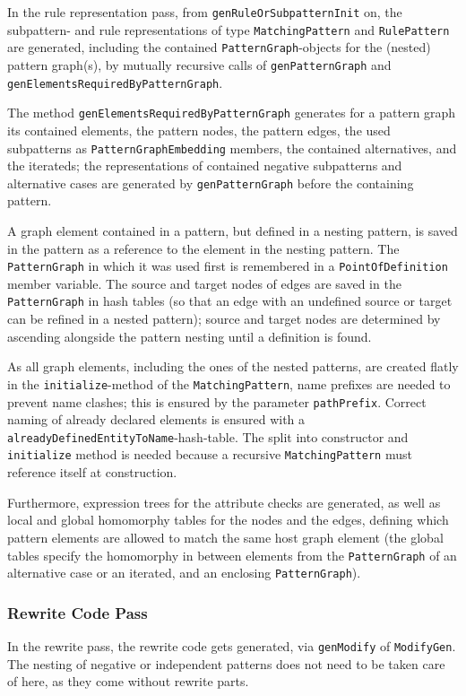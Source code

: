 In the rule representation pass, from \texttt{gen\-Rule\-Or\-Subpattern\-Init} on, the subpattern- and rule representations of type \texttt{Matching\-Pattern} and \texttt{Rule\-Pattern} are generated, including the contained \texttt{Pattern\-Graph}-objects for the (nested) pattern graph(s), by mutually recursive calls of \texttt{gen\-Pattern\-Graph} and \texttt{gen\-Elements\-Required\-By\-Pattern\-Graph}.

The method \texttt{gen\-Elements\-Required\-By\-Pattern\-Graph} generates for a pattern graph its contained elements, the pattern nodes, the pattern edges, the used subpatterns as \texttt{Pattern\-Graph\-Embedding} members, the contained alternatives, and the iterateds; the representations of contained negative subpatterns and alternative cases are generated by \texttt{gen\-Pattern\-Graph} before the containing pattern. 

A graph element contained in a pattern, but defined in a nesting pattern, is saved in the pattern as a reference to the element in the nesting pattern. 
The \texttt{Pattern\-Graph} in which it was used first is remembered in a \texttt{Point\-Of\-Definition} member variable.
The source and target nodes of edges are saved in the \texttt{Pattern\-Graph} in hash tables (so that an edge with an undefined source or target can be refined in a nested pattern); source and target nodes are determined by ascending alongside the pattern nesting until a definition is found.

As all graph elements, including the ones of the nested patterns, are created flatly in the \texttt{initialize}-method of the \texttt{Matching\-Pattern}, name prefixes are needed to prevent name clashes; this is ensured by the parameter \texttt{path\-Prefix}.
Correct naming of already declared elements is ensured with a \texttt{already\-Defined\-Entity\-To\-Name}-hash-table.
The split into constructor and \texttt{initialize} method is needed because a recursive \texttt{Matching\-Pattern} must reference itself at construction.

Furthermore, expression trees for the attribute checks are generated, as well as local and global homomorphy tables for the nodes and the edges, defining which pattern elements are allowed to match the same host graph element (the global tables specify the homomorphy in between elements from the \texttt{Pattern\-Graph} of an alternative case or an iterated, and an enclosing \texttt{Pattern\-Graph}).


\subsubsection*{Rewrite Code Pass}
In the rewrite pass, the rewrite code gets generated, via \texttt{gen\-Modify} of \texttt{Modify\-Gen}.
The nesting of negative or independent patterns does not need to be taken care of here, as they come without rewrite parts.

